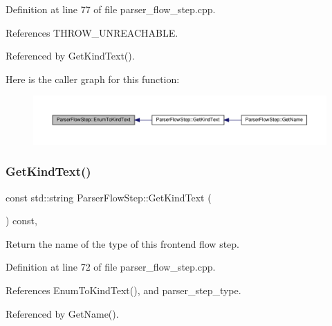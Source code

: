 Definition at line 77 of file parser\+\_\+flow\+\_\+step.\+cpp.



References T\+H\+R\+O\+W\+\_\+\+U\+N\+R\+E\+A\+C\+H\+A\+B\+LE.



Referenced by Get\+Kind\+Text().

Here is the caller graph for this function\+:
\nopagebreak
\begin{figure}[H]
\begin{center}
\leavevmode
\includegraphics[width=350pt]{dd/d99/classParserFlowStep_aace57969f3a1eb1432ab9f31de6da753_icgraph}
\end{center}
\end{figure}
\mbox{\label{classParserFlowStep_a36b924fdaa571a7581c91586c22a3ff7}} 
\subsubsection{\texorpdfstring{Get\+Kind\+Text()}{GetKindText()}}
{\footnotesize\ttfamily const std\+::string Parser\+Flow\+Step\+::\+Get\+Kind\+Text (\begin{DoxyParamCaption}{ }\end{DoxyParamCaption}) const\hspace{0.3cm}{\ttfamily [protected]}, {\ttfamily [virtual]}}



Return the name of the type of this frontend flow step. 



Definition at line 72 of file parser\+\_\+flow\+\_\+step.\+cpp.



References Enum\+To\+Kind\+Text(), and parser\+\_\+step\+\_\+type.



Referenced by Get\+Name().

